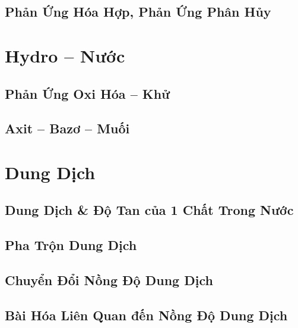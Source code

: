 \documentclass{article}
\numberwithin{equation}{section}
\begin{document}

\subsection{Phản Ứng Hóa Hợp, Phản Ứng Phân Hủy}


\section{Hydro -- Nước}

\subsection{Phản Ứng Oxi Hóa -- Khử}


\subsection{Axit -- Bazơ -- Muối}


\section{Dung Dịch}

\subsection{Dung Dịch \& Độ Tan của 1 Chất Trong Nước}


\subsection{Pha Trộn Dung Dịch}


\subsection{Chuyển Đổi Nồng Độ Dung Dịch}


\subsection{Bài Hóa Liên Quan đến Nồng Độ Dung Dịch}


\printbibliography[heading=bibintoc]
	
\end{document}
